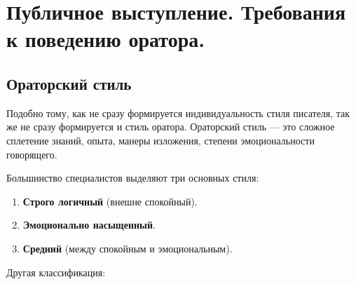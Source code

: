 \section{Публичное выступление. Требования к поведению оратора.}
    \subsection*{Ораторский стиль}
     \hspace{\parindent} Подобно тому, как не сразу формируется индивидуальность стиля писателя,  так же не сразу формируется и стиль оратора. Ораторский стиль — это сложное сплетение знаний, опыта, манеры изложения, степени эмоциональности говорящего.

     Большинство специалистов выделяют три основных стиля:
    \begin{enumerate} 
        \item \textbf{Строго логичный} (внешне спокойный).
        \item \textbf{Эмоционально насыщенный}.
        \item \textbf{Средний} (между спокойным и эмоциональным).
    \end{enumerate}
    Другая классификация:
